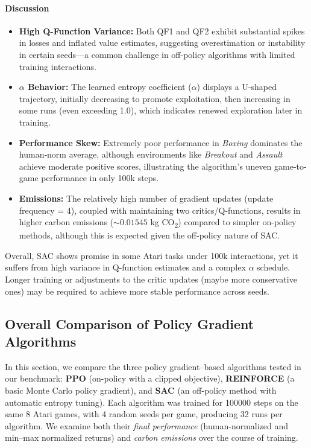 \paragraph{Discussion}
\begin{itemize}
	\item \textbf{High Q-Function Variance:} Both QF1 and QF2 exhibit substantial spikes in losses and inflated value estimates, suggesting overestimation or instability in certain seeds—a common challenge in off-policy algorithms with limited training interactions.
	\item \textbf{\(\alpha\) Behavior:} The learned entropy coefficient (\(\alpha\)) displays a U-shaped trajectory, initially decreasing to promote exploitation, then increasing in some runs (even exceeding 1.0), which indicates renewed exploration later in training.
	\item \textbf{Performance Skew:} Extremely poor performance in \emph{Boxing} dominates the human‐norm average, although environments like \emph{Breakout} and \emph{Assault} achieve moderate positive scores, illustrating the algorithm’s uneven game-to-game performance in only 100k steps.
	\item \textbf{Emissions:} The relatively high number of gradient updates (update frequency = 4), coupled with maintaining two critics/Q-functions, results in higher carbon emissions (\(\sim0.01545\) kg CO\textsubscript{2}) compared to simpler on-policy methods, although this is expected given the off-policy nature of SAC.
\end{itemize}

Overall, SAC shows promise in some Atari tasks under 100k interactions, yet it suffers from high variance in Q-function estimates and a complex \(\alpha\) schedule. Longer training or adjustments to the critic updates (maybe more conservative ones) may be required to achieve more stable performance across seeds.

\subsection{Overall Comparison of Policy Gradient Algorithms}
\label{subsec:policy_comparison}
In this section, we compare the three policy gradient–based algorithms tested in our benchmark: \textbf{PPO} (on-policy with a clipped objective), \textbf{REINFORCE} (a basic Monte Carlo policy gradient), and \textbf{SAC} (an off-policy method with automatic entropy tuning). Each algorithm was trained for \num{100000} steps on the same 8 Atari games, with 4 random seeds per game, producing 32 runs per algorithm. We examine both their \emph{final performance} (human‐normalized and min–max normalized returns) and \emph{carbon emissions} over the course of training.

